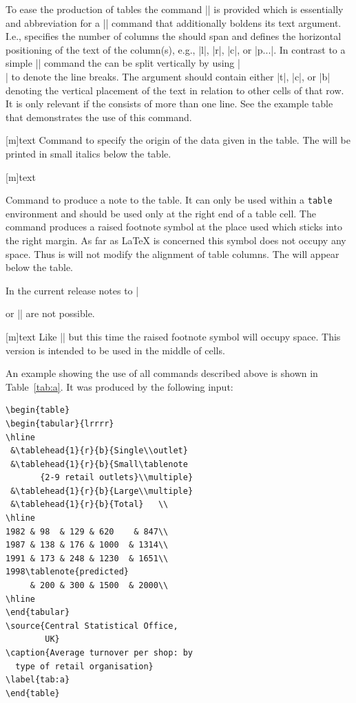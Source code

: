 To ease the production of tables the command |\tablehead| is provided
which is essentially and abbreviation for a |\multicolumn| command
that additionally boldens its text argument. I.e., 
specifies the number of columns the  should span
and  defines the horizontal positioning of the text of the
column(s), e.g., |l|, |r|, |c|, or |p{...}|.  In contrast to a simple
|\multicolumn| command the  can be split vertically
by using |\\| to denote the line breaks.  The  argument
should contain either |t|, |c|, or |b| denoting the vertical placement
of the text in relation to other cells of that row. It is only
relevant if the  consists of more than one
line. See the example table  that
demonstrates the use of this command.

[m]{text} Command to specify the origin of the data
given in the table. The  will be printed in small italics
below the table.

[m]{text}

Command to produce a note to the table. It can only be used within a
\texttt{table} environment and should be used only at the right
end of a table cell. The command produces a raised footnote symbol at
the place used which sticks into the right margin. As far as \LaTeX{}
is concerned this symbol does not occupy any space. Thus is will not
modify the alignment of table columns. The  will appear
below the table.

In the current release notes to |\caption| or |\source| are not
possible.

[m]{text}
Like |\tablenote| but this time the raised footnote symbol will occupy
space. This version is intended to be used in the middle of cells.

An example showing the use of all commands described above is shown in
Table~\vref{tab:a}. It was produced by the following input:\label{tab:source}
\begin{verbatim}
\begin{table}
\begin{tabular}{lrrrr}
\hline
 &\tablehead{1}{r}{b}{Single\\outlet}
 &\tablehead{1}{r}{b}{Small\tablenote
       {2-9 retail outlets}\\multiple}
 &\tablehead{1}{r}{b}{Large\\multiple}
 &\tablehead{1}{r}{b}{Total}   \\
\hline
1982 & 98  & 129 & 620    & 847\\
1987 & 138 & 176 & 1000  & 1314\\
1991 & 173 & 248 & 1230  & 1651\\
1998\tablenote{predicted}
     & 200 & 300 & 1500  & 2000\\
\hline
\end{tabular}
\source{Central Statistical Office,
        UK}
\caption{Average turnover per shop: by
  type of retail organisation}
\label{tab:a}
\end{table}
\end{verbatim}

